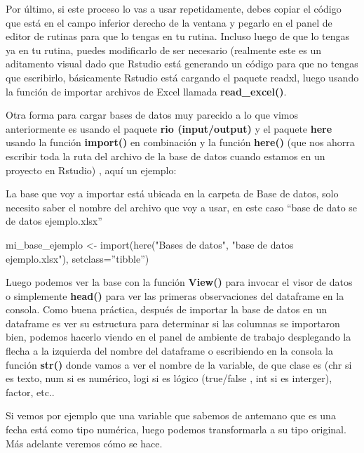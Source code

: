 \documentclass[
  letterpaper,
  DIV=11,
  numbers=noendperiod]{scrreprt}
\newenvironment{Shaded}{\begin{snugshade}}{\end{snugshade}}
\newcommand{\AttributeTok}[1]{\textcolor[rgb]{0.40,0.45,0.13}{#1}}
\newcommand{\FunctionTok}[1]{\textcolor[rgb]{0.28,0.35,0.67}{#1}}
\newcommand{\NormalTok}[1]{\textcolor[rgb]{0.00,0.23,0.31}{#1}}
\newcommand{\OtherTok}[1]{\textcolor[rgb]{0.00,0.23,0.31}{#1}}
\newcommand{\StringTok}[1]{\textcolor[rgb]{0.13,0.47,0.30}{#1}}
\begin{document}
Por último, si este proceso lo vas a usar repetidamente, debes copiar el
código que está en el campo inferior derecho de la ventana y pegarlo en
el panel de editor de rutinas para que lo tengas en tu rutina. Incluso
luego de que lo tengas ya en tu rutina, puedes modificarlo de ser
necesario (realmente este es un aditamento visual dado que Rstudio está
generando un código para que no tengas que escribirlo, básicamente
Rstudio está cargando el paquete readxl, luego usando la función de
importar archivos de Excel llamada \textbf{read\_excel()}.

Otra forma para cargar bases de datos muy parecido a lo que vimos
anteriormente es usando el paquete \textbf{rio (input/output)} y el
paquete \textbf{here} usando la función \textbf{import()} en combinación
y la función \textbf{here()} (que nos ahorra escribir toda la ruta del
archivo de la base de datos cuando estamos en un proyecto en Rstudio) ,
aquí un ejemplo:

La base que voy a importar está ubicada en la carpeta de Base de datos,
solo necesito saber el nombre del archivo que voy a usar, en este caso
``base de dato se de datos ejemplo.xlsx''

\begin{Shaded}
\begin{Highlighting}[]
\NormalTok{mi\_base\_ejemplo }\OtherTok{\textless{}{-}} \FunctionTok{import}\NormalTok{(}\FunctionTok{here}\NormalTok{(}\StringTok{"Bases de datos"}\NormalTok{, }\StringTok{"base de datos ejemplo.xlsx"}\NormalTok{), }\AttributeTok{setclass=}\NormalTok{”tibble”)}
\end{Highlighting}
\end{Shaded}

Luego podemos ver la base con la función \textbf{View()} para invocar el
visor de datos o simplemente \textbf{head()} para ver las primeras
observaciones del dataframe en la consola. Como buena práctica, después
de importar la base de datos en un dataframe es ver su estructura para
determinar si las columnas se importaron bien, podemos hacerlo viendo en
el panel de ambiente de trabajo desplegando la flecha a la izquierda del
nombre del dataframe o escribiendo en la consola la función
\textbf{str()} donde vamos a ver el nombre de la variable, de que clase
es (chr si es texto, num si es numérico, logi si es lógico (true/false ,
int si es interger), factor, etc..

Si vemos por ejemplo que una variable que sabemos de antemano que es una
fecha está como tipo numérica, luego podemos transformarla a su tipo
original. Más adelante veremos cómo se hace.
\end{document}
